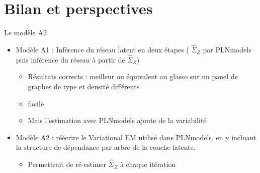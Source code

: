 \documentclass[11pt]{bredelebeamer}
\begin{document}
\section{Bilan et perspectives}
\begin{frame}{Le modèle A2}
    \begin{itemize}
        \item Modèle A1 : Inférence du réseau latent en deux étapes ( $\hat{\Sigma}_Z$ par {\selectfont
PLNmodels} puis inférence du réseau à partir de  $\hat{\Sigma}_Z$)
        \begin{itemize}
        \item Résultats corrects : meilleur ou équivalent au glasso sur un panel de graphes de type et densité différents
            \item facile
            \item Mais l'estimation avec 
{\selectfont
PLNmodels} ajoute de la variabilité \vspace{1cm}
        \end{itemize}
        \item Modèle A2 : réécrire le Variational EM utilisé dans {\selectfont
PLNmodels}, en y incluant la structure de dépendance par arbre de la couche latente.
         \begin{itemize}
             \item Permettrait de ré-estimer  $\hat{\Sigma}_Z$ à chaque itération
         \end{itemize}
    \end{itemize}
\end{frame}
\end{document}
